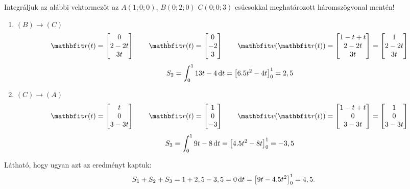 \documentclass[exercise]{math-standalone}
\begin{document}
\begin{exercise}{%
    Integráljuk az alábbi vektormezőt az $A(1;0;0)$, $B(0;2;0)$ $C(0;0;3)$
    csúcsokkal meghatározott háromszögvonal mentén!
  }
{\begin{enumerate}
      \item $(B) \rightarrow (C)$
            \[
              \arcv(t) = \begin{bmatrix}
                0 \\ 2 - 2t \\ 3t
              \end{bmatrix}
              \qquad
              \dot{\arcv}(t) = \begin{bmatrix}
                0 \\ -2 \\ 3
              \end{bmatrix}
              \qquad
              \rvec v(\rvec r(t)) = \begin{bmatrix}
                1 - t + t \\ 2 - 2t \\ 3t
              \end{bmatrix} = \begin{bmatrix}
                1 \\ 2 - 2t \\ 3t
              \end{bmatrix}
            \]
            \[
              S_2 = \int_0^1 13t - 4 \, \mathrm{d} t = \left[ 6.5t^2 - 4t \right]_0^1 = 2,5
            \]

      \item $(C) \rightarrow (A)$
            \[
              \arcv(t) = \begin{bmatrix}
                t \\ 0 \\ 3 - 3t
              \end{bmatrix}
              \qquad
              \dot{\arcv}(t) = \begin{bmatrix}
                1 \\ 0 \\ -3
              \end{bmatrix}
              \qquad
              \rvec v(\rvec r(t)) = \begin{bmatrix}
                1 - t + t \\ 0 \\ 3 - 3t
              \end{bmatrix} = \begin{bmatrix}
                1 \\ 0 \\ 3 - 3t
              \end{bmatrix}
            \]
            \[
              S_3 = \int_0^1 9t - 8 \, \mathrm{d} t = \left[ 4.5t^2 - 8t \right]_0^1 = -3,5
            \]
    \end{enumerate}
    Látható, hogy ugyan azt az eredményt kaptuk:
    \[
      S_1 + S_2 + S_3 = 1 + 2,5 - 3,5 = 0
      \text  \, \mathrm{d} t = \left[ 9t - 4.5t^2 \right]_0^1 = 4,5.
    \]
  }
\end{exercise}
\end{document}
